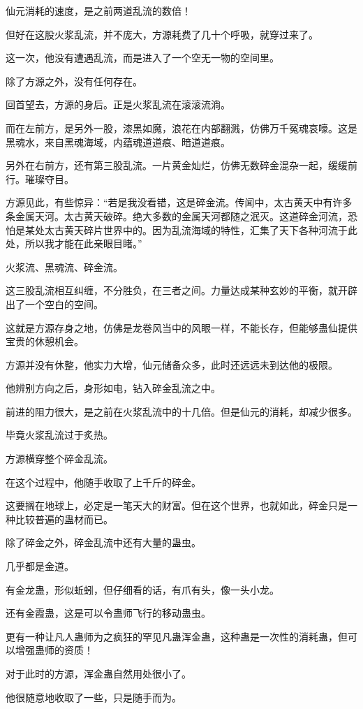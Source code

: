 \begin{this_body}
仙元消耗的速度，是之前两道乱流的数倍！

但好在这股火浆乱流，并不庞大，方源耗费了几十个呼吸，就穿过来了。

这一次，他没有遭遇乱流，而是进入了一个空无一物的空间里。

除了方源之外，没有任何存在。

回首望去，方源的身后。正是火浆乱流在滚滚流淌。

而在左前方，是另外一股，漆黑如魔，浪花在内部翻溅，仿佛万千冤魂哀嚎。这是黑魂水，来自黑魂海域，内蕴魂道道痕、暗道道痕。

另外在右前方，还有第三股乱流。一片黄金灿烂，仿佛无数碎金混杂一起，缓缓前行。璀璨夺目。

方源见此，有些惊异：“若是我没看错，这是碎金流。传闻中，太古黄天中有许多条金属天河。太古黄天破碎。绝大多数的金属天河都随之泯灭。这道碎金河流，恐怕是某处太古黄天碎片世界中的。因为乱流海域的特性，汇集了天下各种河流于此处，所以我才能在此亲眼目睹。”

火浆流、黑魂流、碎金流。

这三股乱流相互纠缠，不分胜负，在三者之间。力量达成某种玄妙的平衡，就开辟出了一个空白的空间。

这就是方源存身之地，仿佛是龙卷风当中的风眼一样，不能长存，但能够蛊仙提供宝贵的休憩机会。

方源并没有休整，他实力大增，仙元储备众多，此时还远远未到达他的极限。

他辨别方向之后，身形如电，钻入碎金乱流之中。

前进的阻力很大，是之前在火浆乱流中的十几倍。但是仙元的消耗，却减少很多。

毕竟火浆乱流过于炙热。

方源横穿整个碎金乱流。

在这个过程中，他随手收取了上千斤的碎金。

这要搁在地球上，必定是一笔天大的财富。但在这个世界，也就如此，碎金只是一种比较普遍的蛊材而已。

除了碎金之外，碎金乱流中还有大量的蛊虫。

几乎都是金道。

有金龙蛊，形似蚯蚓，但仔细看的话，有爪有头，像一头小龙。

还有金霞蛊，这是可以令蛊师飞行的移动蛊虫。

更有一种让凡人蛊师为之疯狂的罕见凡蛊浑金蛊，这种蛊是一次性的消耗蛊，但可以增强蛊师的资质！

对于此时的方源，浑金蛊自然用处很小了。

他很随意地收取了一些，只是随手而为。


\end{this_body}
